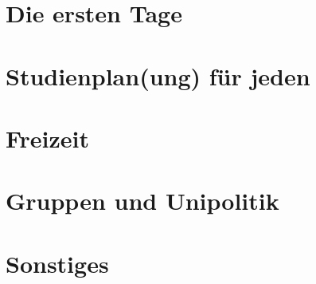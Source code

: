 \documentclass[]{papertex}
\begin{document}
	\thispagestyle{empty}
	\clearpage
	\setcounter{page}{1}
	\tableofcontents
	
	\newpage
	\section{Die ersten Tage}
		
		
	\newpage
	\section{Studienplan(ung) für jeden}
		\label{studienplan}
	
	 
	
	\newpage
	\section{Freizeit}
		\label{freizeit}
		
	\newpage
	\section{Gruppen und Unipolitik}
		\label{politik}
		
		
	\newpage
	\section{Sonstiges}
		\label{sonstiges}
		
		
		
		
\end{document}
